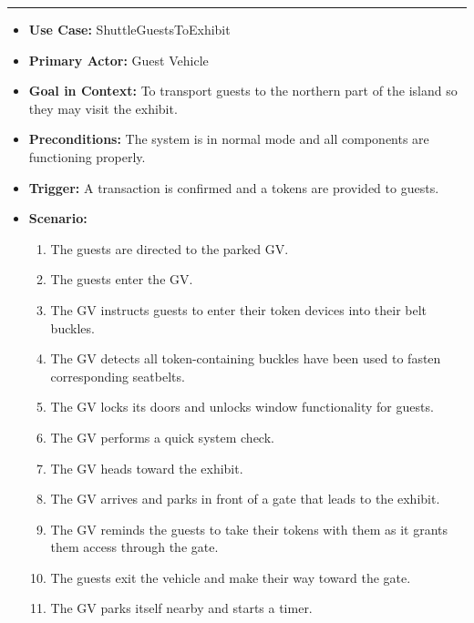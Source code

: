 \documentclass[12pt]{article}
\begin{document}
    \par\noindent\rule{\textwidth}{0.4pt}    
    \begin{itemize}
        \item[]\textbf{Use Case:}                                
            ShuttleGuestsToExhibit

        \item[]\textbf{Primary Actor:}
            Guest Vehicle

        \item[]\textbf{Goal in Context:}
            To transport guests to the northern part of the island so they may 
            visit the exhibit.

        \item[]\textbf{Preconditions:}
            The system is in normal mode and all components are functioning properly.

        \item[]\textbf{Trigger:}
            A transaction is confirmed and a tokens are provided to guests.

        \item[]\textbf{Scenario:}
            \begin{enumerate}
                \item The guests are directed to the parked GV.
                \item The guests enter the GV.
                \item The GV instructs guests to enter their token devices into their belt buckles.
                \item The GV detects all token-containing buckles have been used to fasten corresponding seatbelts.
                \item The GV locks its doors and unlocks window functionality for guests.
                \item The GV performs a quick system check.
                \item The GV heads toward the exhibit.
                \item The GV arrives and parks in front of a gate that leads to the exhibit.
                \item The GV reminds the guests to take their tokens with them as it grants them access through the gate.
                \item The guests exit the vehicle and make their way toward the gate.
                \item The GV parks itself nearby and starts a timer.
            \end{enumerate}


\end{itemize}
\end{document}
